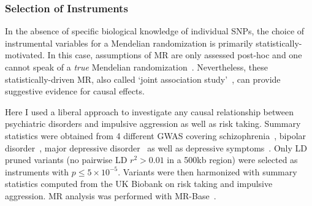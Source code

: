\subsubsection{Selection of Instruments}
\label{ssub:Selection_of_Intstuments}

In the absence of specific biological knowledge of individual SNPs, the choice of instrumental variables for a Mendelian randomization  is primarily statistically-motivated.
In this case, assumptions of MR are only assessed post-hoc and one cannot speak of a \textit{true} Mendelian randomization~\cite{Burgess2016a}.
Nevertheless, these statistically-driven MR, also called `joint association study'~\cite{Burgess2016a}, can provide suggestive evidence for causal effects.

Here I used a liberal approach to investigate any causal relationship between psychiatric disorders and impulsive aggression as well as risk taking.
Summary statistics were obtained from 4 different GWAS covering schizophrenia~\cite{Ripke2014}, bipolar disorder~\cite{PsychiatricGWASConsortiumBipolarDisorderWorkingGroup2011}, major depressive disorder~\cite{MajorDepressiveDisorderWorkingGroupofthePsychiatricGWASConsortium2013} as well as depressive symptoms~\cite{Okbay2016}.
Only LD pruned variants (no pairwise LD $r^2>0.01$ in a 500kb region) were selected as instruments with $p\leq 5\times 10^{-5}$.
Variants were then harmonized with summary statistics computed from the UK Biobank on risk taking and impulsive aggression. 
MR analysis was performed with MR-Base~\cite{Hemani2016}.
